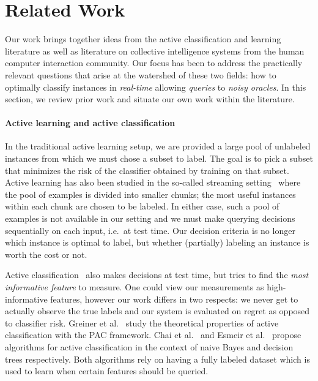 \section{Related Work}
\label{sec:related}


Our work brings together ideas from the active classification and learning literature as well as literature on collective intelligence systems from the human computer interaction community.
Our focus has been to address the practically relevant questions that arise at the watershed of these two fields: how to optimally classify instances in {\em real-time} allowing {\em queries} to {\em noisy oracles}. 
In this section, we review prior work and situate our own work within the literature.

\paragraph{Active learning and active classification}
In the traditional active learning setup, we are provided a large pool of unlabeled instances from which we must chose a subset to label. The goal is to pick a subset that minimizes the risk of the classifier obtained by training on that subset. 
Active learning has also been studied in the so-called streaming setting~\cite{agarwal2013selective,cheng2013feedback,chu2011unbiased,helmbold1997some,vzliobaite2011active} where the pool of examples is divided into smaller chunks; the most useful instances within each chunk are chosen to be labeled.
In either case, such a pool of examples is not available in our setting and we must make querying decisions sequentially on each input, i.e.\ at test time.
Our decision criteria is no longer which instance is optimal to label, but whether (partially) labeling an instance is worth the cost or not.

Active classification~\cite{greiner2002learning} also makes decisions at test time, but tries to find the {\em most informative feature} to measure.
One could view our measurements as high-informative features, however our work differs in two respects: we never get to actually observe the true labels and our system is evaluated on regret as opposed to classifier risk.
Greiner et al.~\cite{greiner2002learning} study the theoretical properties of active classification with the PAC framework.
Chai et al.~\cite{chai2004test} and Esmeir et al.~\cite{esmeir2007anytime} propose algorithms for active classification in the context of naive Bayes and decision trees respectively. Both algorithms rely on having a fully labeled dataset which is used to learn when certain features should be queried.


